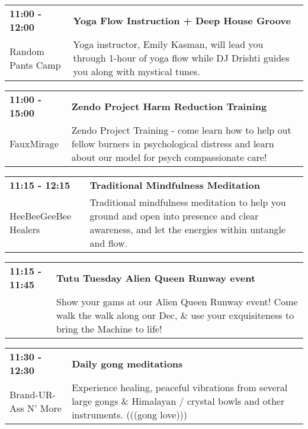 \begin{tabular}{ p{1in} p{2.2in} }
    \textbf{11:00 - 12:00} & \textbf{Yoga Flow Instruction + Deep House Groove} \\
    Random Pants Camp \newline  & Yoga instructor, Emily Kasman, will lead you through 1-hour of yoga flow while DJ Drishti guides you along with mystical tunes. \\
    \hline 
\end{tabular}
    
\begin{tabular}{ p{1in} p{2.2in} }
    \textbf{11:00 - 15:00} & \textbf{Zendo Project Harm Reduction Training } \\
    FauxMirage \newline  & Zendo Project Training - come learn how to help out fellow burners in psychological distress and learn about our model for psych compassionate care! \\
    \hline 
\end{tabular}
    
\begin{tabular}{ p{1in} p{2.2in} }
    \textbf{11:15 - 12:15} & \textbf{Traditional Mindfulness Meditation} \\
    HeeBeeGeeBee Healers \newline  & Traditional mindfulness meditation to help you ground and open into presence and clear awareness, and let the energies within untangle and flow. \\
    \hline 
\end{tabular}
    
\begin{tabular}{ p{1in} p{2.2in} }
    \textbf{11:15 - 11:45} & \textbf{Tutu Tuesday Alien Queen Runway event} \\
    ~ \newline  & Show your gams at our Alien Queen Runway event! Come walk the walk along our Dec, \& use your exquisiteness to bring the Machine to life! \\
    \hline 
\end{tabular}
    
\begin{tabular}{ p{1in} p{2.2in} }
    \textbf{11:30 - 12:30} & \textbf{Daily gong meditations} \\
    Brand-UR-Ass N' More \newline  & Experience healing, peaceful vibrations from several large gongs \& Himalayan / crystal bowls and other instruments. (((gong love))) \\
    \hline 
\end{tabular}
    
